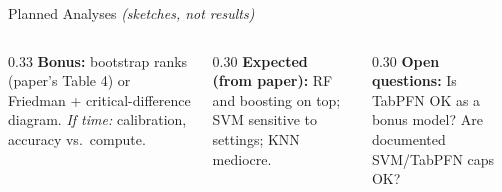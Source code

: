\documentclass[aspectratio=169,11pt]{beamer}
\begin{document}
\begin{frame}{Planned Analyses \emph{(sketches, not results)}}
\vspace{6pt}
\begin{columns}[T]
\begin{column}{0.33\textwidth}
\scriptsize\textbf{Bonus:} bootstrap ranks (paper's Table 4) or Friedman + critical-difference diagram. \textit{If time:} calibration, accuracy vs.\ compute.
\end{column}
\begin{column}{0.30\textwidth}
\scriptsize\textbf{Expected (from paper):} RF and boosting on top; SVM sensitive to settings; KNN mediocre.
\end{column}
\begin{column}{0.30\textwidth}
\scriptsize\textbf{Open questions:} Is TabPFN OK as a bonus model? Are documented SVM/TabPFN caps OK?
\end{column}
\end{columns}
\end{frame}
\end{document}
